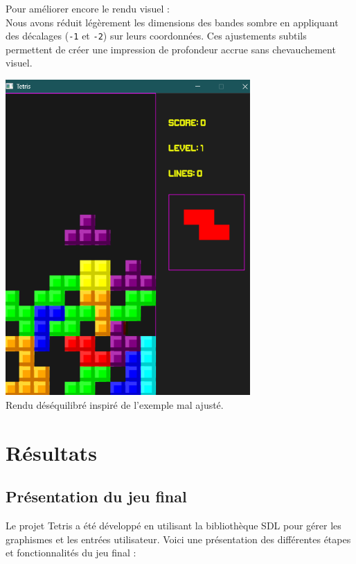 \documentclass[12pt,a4paper]{report}
\begin{document}
Pour améliorer encore le rendu visuel :
\\

Nous avons réduit légèrement les dimensions des bandes sombre en appliquant des décalages (\texttt{-1} et \texttt{-2}) sur leurs coordonnées. Ces ajustements subtils permettent de créer une impression de profondeur accrue sans chevauchement visuel.
\\
\begin{center}
    \includegraphics[width=0.7\textwidth]{Figure_3_Tetris.png}
    \\
    \caption{Rendu déséquilibré inspiré de l'exemple mal ajusté.}
    \label{fig:figure3}
\end{center}

\newpage

\chapter{Résultats}

\section{Présentation du jeu final}

Le projet Tetris a été développé en utilisant la bibliothèque SDL pour gérer les graphismes et les entrées utilisateur. Voici une présentation des différentes étapes et fonctionnalités du jeu final :
\end{document}
